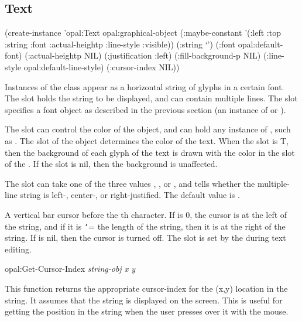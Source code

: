 \subsection{Text}
\label{text}
\begin{programexample}


(create-instance 'opal:Text opal:graphical-object
  (:maybe-constant '(:left :top :string :font :actual-heightp :line-style :visible))
  (:string `')
  (:font opal:default-font)
  (:actual-heightp NIL)
  (:justification :left)
  (:fill-background-p NIL)
  (:line-style opal:default-line-style)
  (:cursor-index NIL))
\end{programexample}

Instances of the  class appear as a horizontal string of glyphs
in a certain font.  The  slot holds the string to be displayed,
and can contain multiple lines.  The  slot specifies a font object
as described in the previous section (an instance of  or
).

The  slot can control the color of the object, and can hold
any instance of , such as .  The
 slot of the  object determines the
color of the text.  When the  slot is T,
then the background of each glyph of the text is drawn with the color in the
 slot of the .  If the
 slot is {\sc nil}, then the background is unaffected.

The  slot can
take one of the three values , , or ,
and tells whether the multiple-line string is left-, center-, or
right-justified.  The default value is .

A vertical bar cursor before the th
character.  If  is 0, the cursor is at the left of the
string, and if it is {\tt\char`\>}= the length of the string, then it is at the right
of the string.  If  is {\sc nil}, then the cursor is turned
off.  The  slot is set by the 
during text editing.

\vspace{1 line}
\begin{programexample}
opal:Get-Cursor-Index {\it string-obj x y}\value{function}
\end{programexample}
This function returns the appropriate cursor-index for the (x,y) location
in the string.  It assumes that the string is displayed on the screen.
This is useful for getting the position in the string when the user presses
over it with the mouse.

